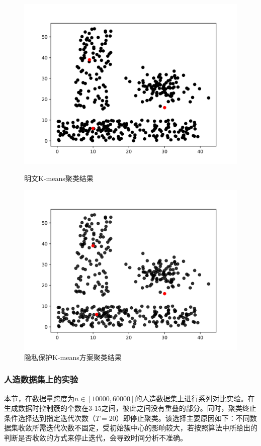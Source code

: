 \begin{figure}[htbp] %
	\begin{minipage}[t]{0.5\linewidth}
		\includegraphics[width=\linewidth]{img/lsun_ptxt.png}
		\caption{明文K-means聚类结果}
		\label{f4}
	\end{minipage}%
	\hfill%
	\begin{minipage}[t]{0.5\linewidth}
		\includegraphics[width=\linewidth]{img/lsun_ctxt.png}
		\caption{隐私保护K-means方案聚类结果}
		\label{f5}
	\end{minipage}
\end{figure}
\subsubsection{人造数据集上的实验}
本节，在数据量跨度为$ n\in[10000,60000] $的人造数据集上进行系列对比实验。在生成数据时控制簇的个数在3-15之间，彼此之间没有重叠的部分。同时，聚类终止条件选择达到指定迭代次数（$ T=20 $）即停止聚类。该选择主要原因如下：不同数据集收敛所需迭代次数不固定，受初始簇中心的影响较大，若按照算法中所给出的判断是否收敛的方式来停止迭代，会导致时间分析不准确。

